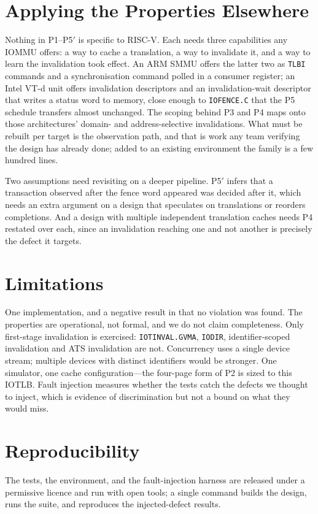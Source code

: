\documentclass[conference]{IEEEtran}
\newcommand{\cmd}[1]{\mbox{\texttt{#1}}}
\begin{document}
\section{Applying the Properties Elsewhere}
Nothing in P1--P5$'$ is specific to RISC-V. Each needs three capabilities any
IOMMU offers: a way to cache a translation, a way to invalidate it, and a way to
learn the invalidation took effect. An ARM SMMU offers the latter two as
\texttt{TLBI} commands and a synchronisation command polled in a consumer
register; an Intel VT-d unit offers invalidation descriptors and an
invalidation-wait descriptor that writes a status word to memory, close enough
to \cmd{IOFENCE.C} that the P5 schedule transfers almost unchanged. The
scoping behind P3 and P4 maps onto those architectures' domain- and
address-selective invalidations. What must be rebuilt per target is the
observation path, and that is work any team verifying the design has already
done; added to an existing environment the family is a few hundred lines.

Two assumptions need revisiting on a deeper pipeline. P5$'$ infers that a
transaction observed after the fence word appeared was decided after it, which
needs an extra argument on a design that speculates on translations or reorders
completions. And a design with multiple independent translation caches needs P4
restated over each, since an invalidation reaching one and not another is
precisely the defect it targets.

\section{Limitations}
One implementation, and a negative result in that no violation was found. The
properties are operational, not formal, and we do not claim completeness. Only
first-stage invalidation is exercised: \cmd{IOTINVAL.GVMA}, \cmd{IODIR},
identifier-scoped invalidation and ATS invalidation are not. Concurrency uses a
single device stream; multiple devices with distinct identifiers would be
stronger. One simulator, one cache configuration---the four-page form of P2 is
sized to this IOTLB. Fault injection measures whether the tests catch the
defects we thought to inject, which is evidence of discrimination but not a
bound on what they would miss.

\section{Reproducibility}
The tests, the environment, and the fault-injection harness are released under a
permissive licence and run with open tools; a single command builds the design,
runs the suite, and reproduces the injected-defect results.
\end{document}
